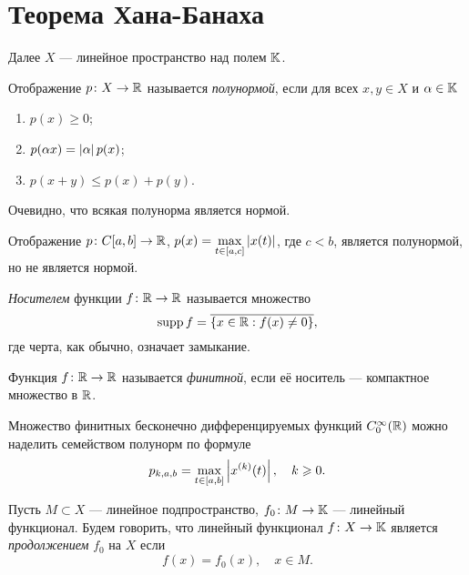 \section{Теорема Хана-Банаха}
Далее $X$ --- линейное пространство над полем $\mathbb{K}$.

\begin{definition}
    Отображение $p \colon X \to \mathbb{R}$ называется \emph{полунормой}, если
    для всех $x, y \in X$ и $\alpha \in \mathbb{K}$
    \begin{enumerate}
        \item $p(x) \geq 0$;
        \item $p(\alpha x) = \left|\alpha\right|p(x)$;
        \item $p(x + y) \leq p(x) + p(y)$.
    \end{enumerate}
\end{definition}

Очевидно, что всякая полунорма является нормой.

\begin{example}
    Отображение $p \colon C[a, b] \to \mathbb{R}$, 
    $p(x) = \max\limits_{t \in [a, c]} \left|x(t)\right|$, 
    где $c < b$, является полунормой, но не является нормой.
\end{example}

\begin{definition}
    \emph{Носителем} функции $f \colon \mathbb{R} \to \mathbb{R}$ называется множество
    \[ \operatorname{supp} f = \overline{\left\{x \in \mathbb{R} : f(x) \neq 0\right\}}, \]
    где черта, как обычно, означает замыкание.
\end{definition}

\begin{definition}
    Функция $f \colon \mathbb{R} \to \mathbb{R}$ называется \emph{финитной}, 
    если её носитель --- компактное множество в $\mathbb{R}$.
\end{definition}

\begin{example}
    Множество финитных бесконечно дифференцируемых функций 
    $C_0^\infty(\mathbb{R})$ можно наделить семейством полунорм
    по формуле
    \[ p_{k,a,b} = \max_{t \in [a,b]} \left|x^{(k)}(t)\right|, \quad k \geqslant 0. \]    
\end{example}

\begin{definition}
    Пусть $M \subset X$ --- линейное подпространство, $f_0 \colon M \to \mathbb{K}$ --- 
    линейный функционал. Будем говорить, что линейный функционал $f \colon X \to \mathbb{K}$
    является \emph{продолжением} $f_0$ на $X$ если
    \[ f(x) = f_0(x), \quad x \in M. \]
\end{definition}

